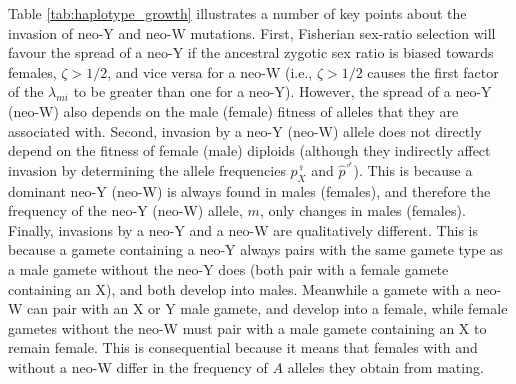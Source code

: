 \documentclass[12pt]{article}
\begin{document}
Table \ref{tab:haplotype_growth} illustrates a number of key points about the invasion of neo-Y and neo-W mutations. 
First, Fisherian sex-ratio selection will favour the spread of a neo-Y if the ancestral zygotic sex ratio is biased towards females, $\zeta>1/2$, and vice versa for a neo-W (i.e., $\zeta>1/2$ causes the first factor of the $\lambda_{mi}$ to be greater than one for a neo-Y).
However, the spread of a neo-Y (neo-W) also depends on the male (female) fitness of alleles that they are associated with. %
Second, invasion by a neo-Y (neo-W) allele does not directly depend on the fitness of female (male) diploids (although they indirectly affect invasion by determining the allele frequencies $p^\female_X$ and $\hat{p}^\male$).
This is because a dominant neo-Y (neo-W) is always found in males (females), and therefore the frequency of the neo-Y (neo-W) allele, $m$, only changes in males (females). 
Finally, invasions by a neo-Y and a neo-W are qualitatively different.
This is because a gamete containing a neo-Y always pairs with the same gamete type as a male gamete without the neo-Y does (both pair with a female gamete containing an X), and both develop into males.
Meanwhile a gamete with a neo-W can pair with an X or Y male gamete, and develop into a female, while female gametes without the neo-W must pair with a male gamete containing an X to remain female.
This is consequential because it means that females with and without a neo-W differ in the frequency of $A$ alleles they obtain from mating.
\end{document}
